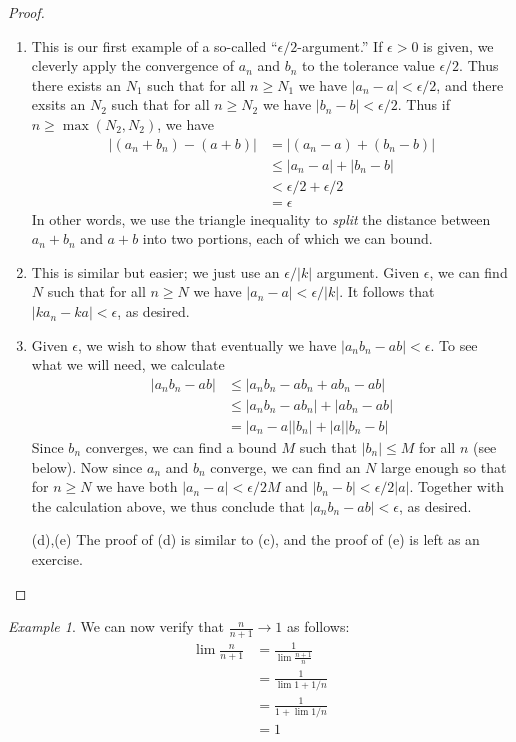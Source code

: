 \documentclass[11pt,oneside]{amsbook}
\theoremstyle{definition}
\theoremstyle{plain}
\theoremstyle{definition}
\theoremstyle{remark}
\newtheorem{example}[theorem]{Example}
\numberwithin{equation}{section}
\numberwithin{figure}{section}
\begin{document}
\begin{proof}
  \begin{enumerate}
  \item This is our first example of a so-called ``$\epsilon/2$-argument.'' If $\epsilon>0$ is given, we cleverly apply the convergence of $a_n$ and $b_n$ to the tolerance value $\epsilon/2$. Thus there exists an $N_1$ such that for all $n\geq N_1$ we have $|a_n-a|<\epsilon/2$, and there exsits an $N_2$ such that for all $n\geq N_2$ we have $|b_n-b|<\epsilon/2$. Thus if $n\geq\max(N_2,N_2)$, we have
    \begin{align*}
      |(a_n+b_n)-(a+b)|&=|(a_n-a)+(b_n-b)|\\
      &\leq|a_n-a|+|b_n-b|\\
      &<\epsilon/2+\epsilon/2\\
      &=\epsilon
    \end{align*}
    In other words, we use the triangle inequality to \emph{split} the distance between $a_n+b_n$ and $a+b$ into two portions, each of which we can bound.
  \item This is similar but easier; we just use an $\epsilon/|k|$ argument. Given $\epsilon$, we can find $N$ such that for all $n\geq N$ we have $|a_n-a|<\epsilon/|k|$. It follows that $|ka_n-ka|<\epsilon$, as desired.
  \item Given $\epsilon$, we wish to show that eventually we have $|a_nb_n-ab|<\epsilon$. To see what we will need, we calculate
    \begin{align*}
      |a_nb_n-ab|&\leq|a_nb_n-ab_n+ab_n-ab|\\
      &\leq|a_nb_n-ab_n|+|ab_n-ab|\\
      &=|a_n-a||b_n|+|a||b_n-b|
    \end{align*}
    Since $b_n$ converges, we can find a bound $M$ such that $|b_n|\leq M$ for all $n$ (see below). Now since $a_n$ and $b_n$ converge, we can find an $N$ large enough so that for $n\geq N$ we have both $|a_n-a|<\epsilon/2M$ and $|b_n-b|<\epsilon/2|a|$. Together with the calculation above, we thus conclude that $|a_nb_n-ab|<\epsilon$, as desired.
  \item[(d),(e)] The proof of (d) is similar to (c), and the proof of (e) is left as an exercise.
  \end{enumerate}
\end{proof}

\begin{example}
  We can now verify that $\frac{n}{n+1}\to1$ as follows:
  \begin{align*}
    \lim\frac{n}{n+1}&=\frac1{\lim\frac{n+1}{n}}\\
    &=\frac1{\lim 1+1/n}\\
    &=\frac1{1+\lim 1/n}\\
    &=1
  \end{align*}
\end{example}
\end{document}
